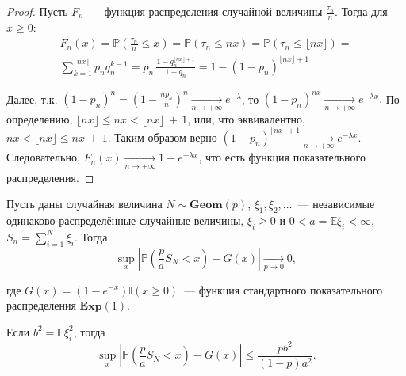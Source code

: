 \begin{proof}
    Пусть $F_n$~--- функция распределения случайной величины $\frac{\tau_n}{n}$.
    Тогда для $x \geqslant 0$:
    \begin{multline*}        
        F_{n}(x)=\mathbb{P}\left(\frac{\tau_{n}}{n} \leqslant x\right)=
        \mathbb{P}\left(\tau_{n} \leqslant n x\right) = 
        \mathbb{P}\left(\tau_{n} \leqslant \lfloor n x\rfloor\right) = \\
        \sum\limits_{k = 1}^{\lfloor nx \rfloor} p_n q_n^{k-1} = 
        p_n \, \frac{1 - q_n^{\lfloor nx \rfloor + 1}} {1-q_n} = 
        1-\left(1-p_{n}\right)^{\lfloor nx \rfloor + 1}
    \end{multline*}
    
    Далее, т.к. $\left(1-p_{n}\right)^{n}=\left(1-\frac{n p_{n}}{n}\right)^{n} \xrightarrow[n \to +\infty]{} e^{-\lambda}$, 
    то $(1 - p_n)^{nx} \xrightarrow[n \to +\infty]{} e^{-\lambda x}.$ 
    По определению, $\lfloor n x\rfloor \leqslant n x<\lfloor n x\rfloor\,+\,1$, 
    или, что эквивалентно, $nx < \lfloor nx \rfloor \leqslant nx\,+\,1$. 
    Таким образом верно $(1 - p_n)^{\lfloor nx \rfloor + 1} \xrightarrow[n \to +\infty]{} e^{-\lambda x}$. 
    Следовательно, $F_n(x) \xrightarrow[n \to +\infty]{} 1 - e^{-\lambda x}$, что есть функция показательного распределения. 
\end{proof}

\begin{namedthm}
Пусть даны случайная величина $N \sim \mathbf{Geom}(p)$, $\xi_1, \xi_2, \ldots$~--- независимые одинаково распределённые случайные величины, 
$\xi_i \geqslant 0$ и $0 < a = \mathbb{E}\xi_i < \infty$, $S_n = \sum\limits_{i=1}^N \xi_i$. Тогда
\begin{equation*}
    \sup\limits_{x}\left|\mathbb{P}\left(\frac{p}{a} S_{N}<x\right)-G(x)\right| \underset{p \rightarrow 0}{\longrightarrow} 0,
\end{equation*}

где $G(x)=\left(1-e^{-x}\right) \mathbb{I}(x \geqslant 0)$~--- функция стандартного показательного распределения $\mathbf{Exp}(1)$.

Если $b^2 = \mathbb{E}\xi_i^2$, тогда
\begin{equation*}
    \sup\limits_{x}\left|\mathbb{P}\left(\frac{p}{a} S_{N}<x\right)-G(x)\right| \leqslant \frac{p b^{2}}{(1-p) a^{2}}.
\end{equation*}
\end{namedthm}
